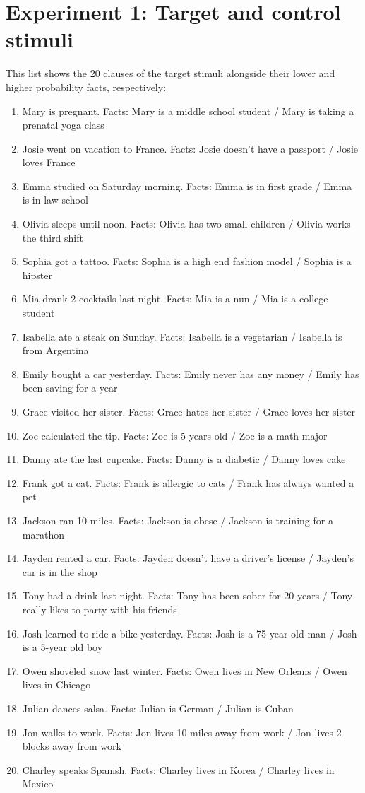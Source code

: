 \documentclass[11pt,fleqn]{article}
\newcommand{\6}{\mbox{$[\hspace*{-.6mm}[$}}
\newcommand{\9}{\mbox{$]\hspace*{-.6mm}]$}}
\begin{document}
\section{Experiment 1: Target and control stimuli}\label{a-stim}

This list shows the 20 clauses of the target stimuli alongside their lower and higher probability facts, respectively:

\begin{enumerate}[leftmargin=4ex,itemsep=-2pt]
\item Mary is pregnant. Facts: Mary is a middle school student / Mary is taking a prenatal yoga class
\item Josie went on vacation to France. Facts:  Josie doesn't have a passport / Josie loves France 
\item Emma studied on Saturday morning. Facts: Emma is in first grade / Emma is in law school 
\item Olivia sleeps until noon. Facts: Olivia has two small children / Olivia works the third shift
\item Sophia got a tattoo. Facts: Sophia is a high end fashion model / Sophia is a hipster
\item Mia drank 2 cocktails last night. Facts: Mia is a nun / Mia is a college student
\item Isabella ate a steak on Sunday. Facts: Isabella is a vegetarian / Isabella is from Argentina
\item Emily bought a car yesterday. Facts: Emily never has any money / Emily has been saving for a year
\item Grace visited her sister. Facts: Grace hates her sister / Grace loves her sister
\item Zoe calculated the tip. Facts: Zoe is 5 years old / Zoe is a math major
\item Danny ate the last cupcake. Facts: Danny is a diabetic / Danny loves cake
\item Frank got a cat. Facts: Frank is allergic to cats / Frank has always wanted a pet
\item Jackson ran 10 miles. Facts: Jackson is obese / Jackson is training for a marathon
\item Jayden rented a car. Facts: Jayden doesn't have a driver's license / Jayden's car is in the shop
\item Tony had a drink last night. Facts: Tony has been sober for 20 years / Tony really likes to party with his friends
\item Josh learned to ride a bike yesterday. Facts: Josh is a 75-year old man / Josh is a 5-year old boy
\item Owen shoveled snow last winter. Facts: Owen lives in New Orleans / Owen lives in Chicago
\item Julian dances salsa. Facts: Julian is German / Julian is Cuban
\item Jon walks to work. Facts: Jon lives 10 miles away from work / Jon lives 2 blocks away from work
\item Charley speaks Spanish. Facts: Charley lives in Korea / Charley lives in Mexico
\end{enumerate}
\end{document}
